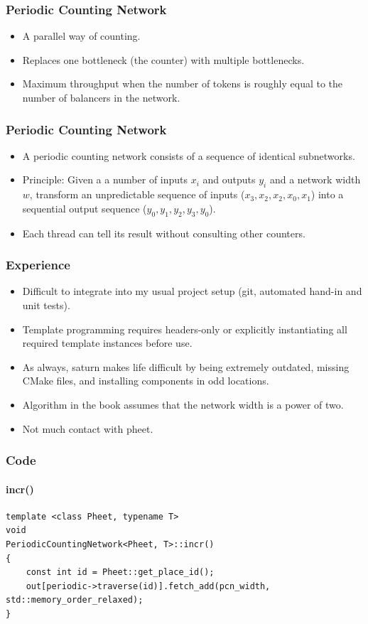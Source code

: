 \documentclass[notes=show]{beamer}
\begin{document}
\begin{frame}
\frametitle{Periodic Counting Network}
\begin{itemize}
\item A parallel way of counting.
\item Replaces one bottleneck (the counter) with multiple bottlenecks.
\item Maximum throughput when the number of tokens is roughly equal to the number of 
 	  balancers in the network.
\end{itemize}
\end{frame}

\begin{frame}
\frametitle{Periodic Counting Network}
\begin{itemize}
\item A periodic counting network consists of a sequence of identical subnetworks.
\item Principle: Given a a number of inputs $x_i$ and outputs $y_i$ and a network width $w$,
      transform an unpredictable sequence of inputs ($x_3, x_2, x_2, x_0, x_1$) into a sequential
      output sequence ($y_0, y_1, y_2, y_3, y_0$).
\item Each thread can tell its result without consulting other counters.
\end{itemize}
\end{frame}

\begin{frame}
\frametitle{Experience}
\begin{itemize}
\item Difficult to integrate into my usual project setup (git, automated
      hand-in and unit tests).
\item Template programming requires headers-only or explicitly instantiating all
      required template instances before use.
\item As always, saturn makes life difficult by being extremely outdated,
      missing CMake files, and installing components in odd locations.
\item Algorithm in the book assumes that the network width is a power of two.
\item Not much contact with pheet.
\end{itemize}
\end{frame}

\begin{frame}[fragile]
\frametitle{Code}
\framesubtitle{incr()}
\begin{lstlisting}
template <class Pheet, typename T>
void
PeriodicCountingNetwork<Pheet, T>::incr()
{
    const int id = Pheet::get_place_id();
    out[periodic->traverse(id)].fetch_add(pcn_width, std::memory_order_relaxed);
}
\end{lstlisting}
\end{frame}
\end{document}
